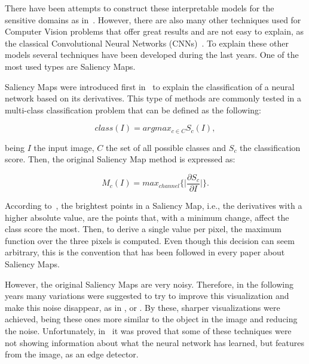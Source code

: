 \documentclass[preprint,12pt]{elsarticle}
\begin{document}
There have been attempts to construct these interpretable models for the sensitive domains as in~\cite{singhThinkPositiveInterpretable2022}. However, there are also many other techniques used for Computer Vision problems that offer great results and are not easy to explain, as the classical Convolutional Neural Networks (CNNs)~\cite{lecunConvolutionalNetworksImages}. To explain these other models  several techniques have been developed during the last years. One of the most used types are Saliency Maps.

Saliency Maps were introduced first in~\cite{simonyanDeepConvolutionalNetworks2014a} to explain the classification of a neural network based on its derivatives. This type of methods are commonly tested in a multi-class classification problem that can be defined as the following:

\begin{equation}
    \label{eq: cnn output}
    class(I) = argmax_{c \in C}S_c(I),
\end{equation}

\noindent
being $I$ the input image, $C$ the set of all possible classes and $S_c$ the classification score. Then, the original Saliency Map method is expressed as:

\begin{equation}
    \label{eq: saliency map}
    M_c(I) = max_{channel}\bigg \{ \bigg |\frac{\partial S_c}{\partial I} \bigg | \bigg \}.
\end{equation}

\noindent
According to~\cite{simonyanDeepConvolutionalNetworks2014a}, the brightest points in a Saliency Map, i.e., the derivatives with a higher absolute value, are the points that, with a minimum change, affect the class score the most. Then, to derive a single value per pixel, the maximum function over the three pixels is computed. Even though this decision can seem arbitrary, this is the convention that has been followed in every paper about Saliency Maps.

However, the original Saliency Maps are very noisy. Therefore, in the following years many variations were suggested to try to improve this visualization and make this noise disappear, as in \cite{springenbergStrivingSimplicityAll2015}, \cite{sundararajanAxiomaticAttributionDeep2017} or \cite{shrikumarNotJustBlack2017}. By these, sharper visualizations were achieved, being these ones more similar to the object in the image and reducing the noise. Unfortunately, in~\cite{adebayoSanityChecksSaliency2018} it was proved that some of these techniques were not showing information about what the neural network has learned, but features from the image, as an edge detector. 
\end{document}
